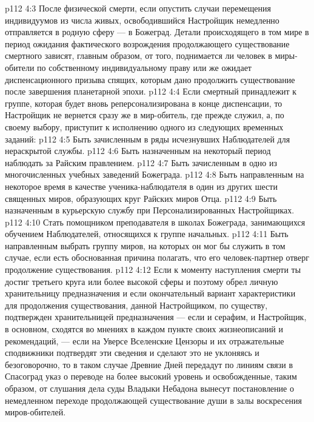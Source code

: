 \vs p112 4:3 После физической смерти, если опустить случаи перемещения индивидуумов из числа живых, освободившийся Настройщик немедленно отправляется в родную сферу --- в Божеград. Детали происходящего в том мире в период ожидания фактического возрождения продолжающего существование смертного зависят, главным образом, от того, поднимается ли человек в миры\hyp{}обители по собственному индивидуальному праву или же ожидает диспенсационного призыва спящих, которым дано продолжить существование после завершения планетарной эпохи.
\vs p112 4:4 Если смертный принадлежит к группе, которая будет вновь реперсонализирована в конце диспенсации, то Настройщик не вернется сразу же в мир\hyp{}обитель, где прежде служил, а, по своему выбору, приступит к исполнению одного из следующих временных заданий:
\vs p112 4:5 \bibnobreakspace Быть зачисленным в ряды исчезнувших Наблюдателей для нераскрытой службы.
\vs p112 4:6 \bibnobreakspace Быть назначенным на некоторый период наблюдать за Райским правлением.
\vs p112 4:7 \bibnobreakspace Быть зачисленным в одно из многочисленных учебных заведений Божеграда.
\vs p112 4:8 \bibnobreakspace Быть направленным на некоторое время в качестве ученика\hyp{}наблюдателя в один из других шести священных миров, образующих круг Райских миров Отца.
\vs p112 4:9 \bibnobreakspace Быть назначенным в курьерскую службу при Персонализированных Настройщиках.
\vs p112 4:10 \bibnobreakspace Стать помощником преподавателя в школах Божеграда, занимающихся обучением Наблюдателей, относящихся к группе начальных.
\vs p112 4:11 \bibnobreakspace Быть направленным выбрать группу миров, на которых он мог бы служить в том случае, если есть обоснованная причина полагать, что его человек\hyp{}партнер отверг продолжение существования.
\vs p112 4:12 \pc Если к моменту наступления смерти ты достиг третьего круга или более высокой сферы и поэтому обрел личную хранительницу предназначения и если окончательный вариант характеристики для продолжения существования, данной Настройщиком, по существу, подтвержден хранительницей предназначения --- если и серафим, и Настройщик, в основном, сходятся во мнениях в каждом пункте своих жизнеописаний и рекомендаций, --- если на Уверсе Вселенские Цензоры и их отражательные сподвижники подтвердят эти сведения и сделают это не уклоняясь и безоговорочно, то в таком случае Древние Дней передадут по линиям связи в Спасоград указ о переводе на более высокий уровень и освобожденные, таким образом, от слушания дела суды Владыки Небадона вынесут постановление о немедленном переходе продолжающей существование души в залы воскресения миров\hyp{}обителей.
